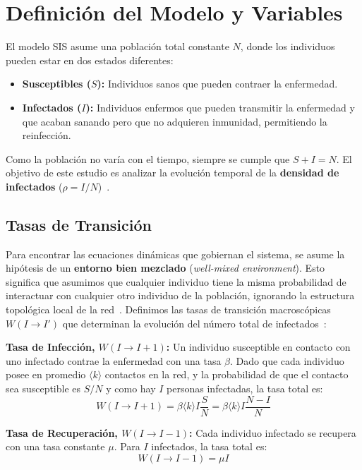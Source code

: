 \documentclass[%
reprint,
amsmath,amssymb,
aps,
]{revtex4-2}
\begin{document}
	\section{Definición del Modelo y Variables}
	El modelo SIS asume una población total constante $N$, donde los individuos pueden estar en dos estados diferentes:
	\begin{itemize}
		\item \textbf{Susceptibles ($S$):} Individuos sanos que pueden contraer la enfermedad.
		\item \textbf{Infectados ($I$):} Individuos enfermos que pueden transmitir la enfermedad y que acaban sanando pero que no adquieren inmunidad, permitiendo la reinfección.
	\end{itemize}
	
	Como la población no varía con el tiempo, siempre se cumple que $S + I = N$. El objetivo de este estudio es analizar la evolución temporal de la \textbf{densidad de infectados} ($\rho = I/N$)~\cite{PastorSatorras2015}.
	
	\subsection{Tasas de Transición}\label{sec:tasas_trans}
	Para encontrar las ecuaciones dinámicas que gobiernan el sistema, se asume la hipótesis de un \textbf{entorno bien mezclado} (\textit{well-mixed environment}). Esto significa que asumimos que cualquier individuo tiene la misma probabilidad de interactuar con cualquier otro individuo de la población, ignorando la estructura topológica local de la red~\cite{PastorSatorras2015,Albert2002}.
	Definimos las tasas de transición macroscópicas $W(I \to I')$ que determinan la evolución del número total de infectados~\cite{Roig2026}:
	
	\textbf{Tasa de Infección, $W(I \to I+1)$:} Un individuo susceptible en contacto con uno infectado contrae la enfermedad con una tasa $\beta$. Dado que cada individuo posee en promedio $\langle k \rangle$ contactos en la red, y la probabilidad de que el contacto sea susceptible es $S/N$ y como hay $I$ personas infectadas, la tasa total es:
	\begin{equation}
		W(I \to I+1) = \beta \langle k \rangle I \frac{S}{N} = \beta \langle k \rangle I \frac{N - I}{N}
	\end{equation}
	
	\textbf{Tasa de Recuperación, $W(I \to I-1)$:} Cada individuo infectado se recupera con una tasa constante $\mu$. Para $I$ infectados, la tasa total es:
	\begin{equation}
		W(I \to I-1) = \mu I
	\end{equation}
	
\end{document}
